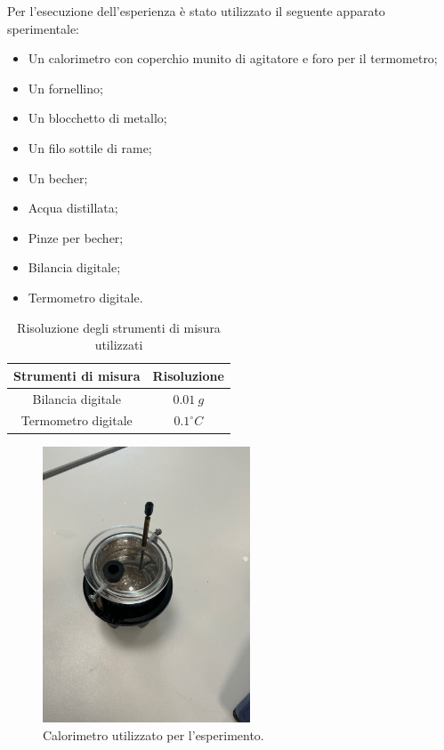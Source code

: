 Per l'esecuzione dell'esperienza è stato utilizzato il seguente apparato sperimentale:
\begin{itemize}
	\item Un calorimetro con coperchio munito di agitatore e foro per il termometro;
	\item Un fornellino;
	\item Un blocchetto di metallo;
	\item Un filo sottile di rame;
	\item Un becher;
	\item Acqua distillata;
	\item Pinze per becher;
	\item Bilancia digitale;
	\item Termometro digitale.
\end{itemize}

\begin{table}[H]
	\centering
	\begin{tabular}{|c|c|}
		\hline
		\textbf{Strumenti di misura} & \textbf{Risoluzione} \\
		\hline
		Bilancia digitale & $0.01\ g$ \\
		\hline
		Termometro digitale & $0.1^{\circ}C$ \\
		\hline
	\end{tabular}
	\caption{Risoluzione degli strumenti di misura utilizzati}
	\label{tab:}
\end{table}

\begin{figure}[H]
	\centering
	\includegraphics[width=0.55\textwidth]{./figures/calorimetro}
	\caption{Calorimetro utilizzato per l'esperimento.}
\end{figure}

